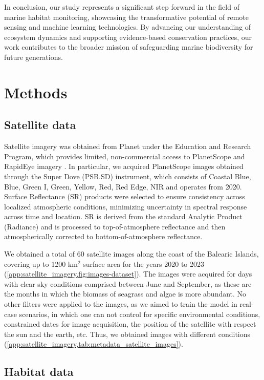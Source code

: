 In conclusion, our study represents a significant step forward in the field of
marine habitat monitoring, showcasing the transformative potential of remote
sensing and machine learning technologies. By advancing our understanding of
ecosystem dynamics and supporting evidence-based conservation practices, our
work contributes to the broader mission of safeguarding marine biodiversity for
future generations.

\section{Methods}

\subsection{Satellite data}

Satellite imagery was obtained from Planet under the Education and Research
Program, which provides limited, non-commercial access to PlanetScope and
RapidEye imagery \cite{planet2017}. In particular, we acquired PlanetScope
images obtained through the Super Dove (PSB.SD) instrument, which consists of
Coastal Blue, Blue, Green I, Green, Yellow, Red, Red Edge, NIR and operates
from 2020. Surface Reflectance (SR) products were selected to ensure
consistency across localized atmospheric conditions, minimizing uncertainty in
spectral response across time and location. SR is derived from the standard
Analytic Product (Radiance) and is processed to top-of-atmosphere reflectance
and then atmospherically corrected to bottom-of-atmosphere reflectance.

We obtained a total of 60 satellite images along the coast of the Balearic
Islands, covering up to 1200 km$^2$ surface area for the years 2020 to 2023
(\cref{app:satellite_imagery,fig:images-dataset}). The images were
acquired for days with clear sky conditions comprised between June and
September, as these are the months in which the biomass of seagrass and algae
is more abundant. No other filters were applied to the images, as we aimed to
train the model in real-case scenarios, in which one can not control for
specific
environmental conditions, constrained dates for image acquisition, the position
of the satellite with respect the sun and the earth, etc. Thus, we obtained
images with different conditions
(\cref{app:satellite_imagery,tab:metadata_satellite_images}).

\subsection{Habitat data}

